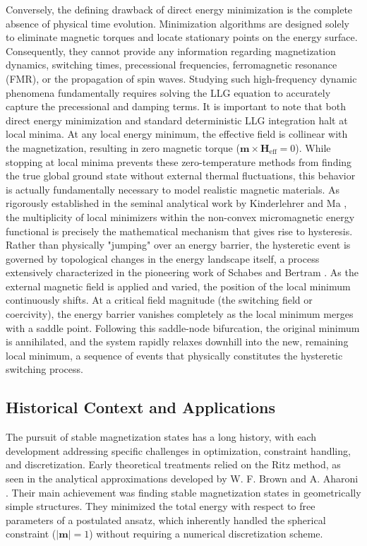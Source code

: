 \documentclass[10pt, a4paper, twocolumn]{article}
\begin{document}
Conversely, the defining drawback of direct energy minimization is the complete absence of physical time evolution. Minimization algorithms are designed solely to eliminate magnetic torques and locate stationary points on the energy surface. Consequently, they cannot provide any information regarding magnetization dynamics, switching times, precessional frequencies, ferromagnetic resonance (FMR), or the propagation of spin waves. Studying such high-frequency dynamic phenomena fundamentally requires solving the LLG equation to accurately capture the precessional and damping terms. It is important to note that both direct energy minimization and standard deterministic LLG integration halt at local minima. At any local energy minimum, the effective field is collinear with the magnetization, resulting in zero magnetic torque ($\mathbf{m} \times \mathbf{H}_{\mathrm{eff}} = 0$). While stopping at local minima prevents these zero-temperature methods from finding the true global ground state without external thermal fluctuations, this behavior is actually fundamentally necessary to model realistic magnetic materials. As rigorously established in the seminal analytical work by Kinderlehrer and Ma \cite{kinderlehrer1997hysteretic}, the multiplicity of local minimizers within the non-convex micromagnetic energy functional is precisely the mathematical mechanism that gives rise to hysteresis. Rather than physically "jumping" over an energy barrier, the hysteretic event is governed by topological changes in the energy landscape itself, a process extensively characterized in the pioneering work of Schabes and Bertram \cite{Schabes1988}. As the external magnetic field is applied and varied, the position of the local minimum continuously shifts. At a critical field magnitude (the switching field or coercivity), the energy barrier vanishes completely as the local minimum merges with a saddle point. Following this saddle-node bifurcation, the original minimum is annihilated, and the system rapidly relaxes downhill into the new, remaining local minimum, a sequence of events that physically constitutes the hysteretic switching process.

\subsection{Historical Context and Applications}
The pursuit of stable magnetization states has a long history, with each development addressing specific challenges in optimization, constraint handling, and discretization. Early theoretical treatments relied on the Ritz method, as seen in the analytical approximations developed by W. F. Brown \cite{Brown1963} and A. Aharoni \cite{Aharoni1996}. Their main achievement was finding stable magnetization states in geometrically simple structures. They minimized the total energy with respect to free parameters of a postulated ansatz, which inherently handled the spherical constraint ($|\mathbf{m}|=1$) without requiring a numerical discretization scheme.
\end{document}
